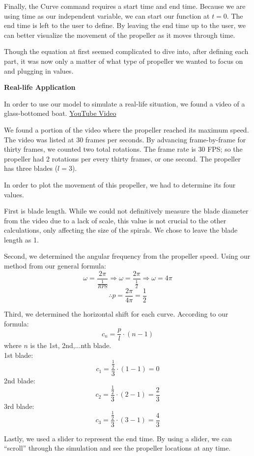 Finally, the Curve command requires a start time and end time. Because we are using time as our independent variable, we can start our function at \(t = 0\). The end time is left to the user to define. By leaving the end time up to the user, we can better visualize the movement of the propeller as it moves through time.

Though the equation at first seemed complicated to dive into, after defining each part, it was now only a matter of what type of propeller we wanted to focus on and plugging in values.

\noindent
\textbf{Real-life Application}

In order to use our model to simulate a real-life situation, we found a video of a glass-bottomed boat. \href{https://www.youtube.com/watch?v=EdXxg20XguY}{YouTube Video}

We found a portion of the video where the propeller reached its maximum speed. The video was listed at 30 frames per seconds. By advancing frame-by-frame for thirty frames, we counted two total rotations. The frame rate is 30 FPS; so the propeller had 2 rotations per every thirty frames, or one second. The propeller has three blades (\(l=3\)). 

In order to plot the movement of this propeller, we had to determine its four values. 

First is blade length. While we could not definitively measure the blade diameter from the video due to a lack of scale, this value is not crucial to the other calculations, only affecting the size of the spirals. We chose to leave the blade length as 1. 

Second, we determined the angular frequency from the propeller speed. Using our method from our general formula:
\[\omega=\frac{2\pi}{\frac{1}{RPS}}\Rightarrow\omega=\frac{2\pi}{\frac{1}{2}}\Rightarrow\omega=4\pi\]
\[\therefore p=\frac{2\pi}{4\pi}=\frac{1}{2}\]

Third, we determined the horizontal shift for each curve. According to our formula:
\[c_n=\frac{p}{l}\cdot(n - 1)\]
where \(n\) is the 1st, 2nd,...nth blade.\\
1st blade:
\[c_1=\frac{\frac{1}{2}}{3}\cdot(1-1)=0\]
2nd blade:
\[c_2=\frac{\frac{1}{2}}{3}\cdot(2-1)=\frac{2}{3}\]
3rd blade:
\[c_3=\frac{\frac{1}{2}}{3}\cdot(3-1)=\frac{4}{3}\]

Lastly, we used a slider to represent the end time. By using a slider, we can “scroll” through the simulation and see the propeller locations at any time.

